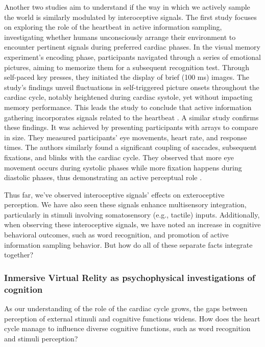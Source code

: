 \documentclass[12pt,oneside,openright]{report}
\begin{document}
Another two studies aim to understand if the way in which we actively sample the world is similarly modulated by interoceptive signals. The first study focuses on exploring the role of the heartbeat in active information sampling, investigating whether humans unconsciously arrange their environment to encounter pertinent signals during preferred cardiac phases. In the visual memory experiment's encoding phase, participants navigated through a series of emotional pictures, aiming to memorize them for a subsequent recognition test. Through self-paced key presses, they initiated the display of brief (100 ms) images. The study's findings unveil fluctuations in self-triggered picture onsets throughout the cardiac cycle, notably heightened during cardiac systole, yet without impacting memory performance. This leads the study to conclude that active information gathering incorporates signals related to the heartbeat \parencite{Kunzendorf2019-vz}. A similar study confirms these findings. It was achieved by presenting participants with arrays to compare in size. They measured participants' eye movements, heart rate, and response times. The authors similarly found a significant coupling of saccades, subsequent fixations, and blinks with the cardiac cycle. They observed that more eye movement occurs during systolic phases while more fixation happens during diastolic phases, thus demonstrating an active perceptual role \parencite{GalvezPol2018ActiveSI}.

Thus far, we've observed interoceptive signals' effects on exteroceptive perception. We have also seen these signals enhance multisensory integration, particularly in stimuli involving somatosensory (e.g., tactile) inputs. Additionally, when observing these interoceptive signals, we have noted an increase in cognitive behavioral outcomes, such as word recognition, and promotion of active information sampling behavior. But how do all of these separate facts integrate together?

\subsubsection*{Inmersive Virtual Relity as psychophysical investigations of cognition}

As our understanding of the role of the cardiac cycle grows, the gaps between perception of external stimuli and cognitive functions widens. How does the heart cycle manage to influence diverse cognitive functions, such as word recognition and stimuli perception?
\end{document}
